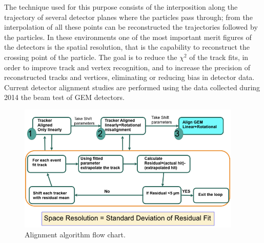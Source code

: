 The technique used for this purpose consists of the interposition along the trajectory of several detector planes where the particles pass through; from the interpolation of all these points can be reconstructed the trajectories followed by the particles.
In these environments one of the most important merit figures of the detectors is the spatial resolution, that is the capability to reconstruct the crossing point of the particle.
The goal is to reduce the $\chi^{2}$ of the track fits, in order to improve track and vertex recognition, and to increase the precision of reconstructed tracks and vertices, eliminating or reducing bias in detector data.
Current detector alignment studies are performed using the data collected during 2014 the beam test of GEM detectors. 

\begin{figure}[htbp]
    \centering
    \includegraphics[width=0.95\textwidth]{figures/GEM/GEM_Alignment_FlowChart.jpeg}
    \caption{Alignment algorithm flow chart.}
    \label{fig:alignment}
\end{figure}

